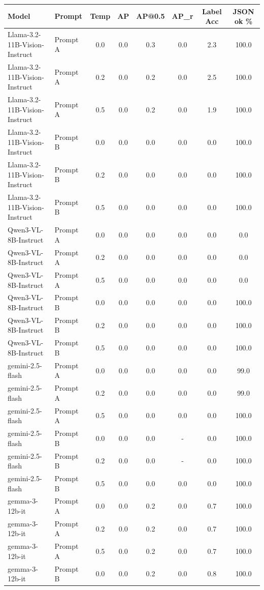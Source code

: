 \begin{tabular}{l l c c c c c c}
\toprule
Model & Prompt & Temp & AP & AP@0.5 & AP\_r & Label Acc & JSON ok \% \\
\midrule
Llama-3.2-11B-Vision-Instruct & Prompt A & 0.0 & 0.0 & 0.3 & 0.0 & 2.3 & 100.0 \\
Llama-3.2-11B-Vision-Instruct & Prompt A & 0.2 & 0.0 & 0.2 & 0.0 & 2.5 & 100.0 \\
Llama-3.2-11B-Vision-Instruct & Prompt A & 0.5 & 0.0 & 0.2 & 0.0 & 1.9 & 100.0 \\
Llama-3.2-11B-Vision-Instruct & Prompt B & 0.0 & 0.0 & 0.0 & 0.0 & 0.0 & 100.0 \\
Llama-3.2-11B-Vision-Instruct & Prompt B & 0.2 & 0.0 & 0.0 & 0.0 & 0.0 & 100.0 \\
Llama-3.2-11B-Vision-Instruct & Prompt B & 0.5 & 0.0 & 0.0 & 0.0 & 0.0 & 100.0 \\
Qwen3-VL-8B-Instruct & Prompt A & 0.0 & 0.0 & 0.0 & 0.0 & 0.0 & 0.0 \\
Qwen3-VL-8B-Instruct & Prompt A & 0.2 & 0.0 & 0.0 & 0.0 & 0.0 & 0.0 \\
Qwen3-VL-8B-Instruct & Prompt A & 0.5 & 0.0 & 0.0 & 0.0 & 0.0 & 0.0 \\
Qwen3-VL-8B-Instruct & Prompt B & 0.0 & 0.0 & 0.0 & 0.0 & 0.0 & 100.0 \\
Qwen3-VL-8B-Instruct & Prompt B & 0.2 & 0.0 & 0.0 & 0.0 & 0.0 & 100.0 \\
Qwen3-VL-8B-Instruct & Prompt B & 0.5 & 0.0 & 0.0 & 0.0 & 0.0 & 100.0 \\
gemini-2.5-flash & Prompt A & 0.0 & 0.0 & 0.0 & 0.0 & 0.0 & 99.0 \\
gemini-2.5-flash & Prompt A & 0.2 & 0.0 & 0.0 & 0.0 & 0.0 & 99.0 \\
gemini-2.5-flash & Prompt A & 0.5 & 0.0 & 0.0 & 0.0 & 0.0 & 100.0 \\
gemini-2.5-flash & Prompt B & 0.0 & 0.0 & 0.0 & - & 0.0 & 100.0 \\
gemini-2.5-flash & Prompt B & 0.2 & 0.0 & 0.0 & - & 0.0 & 100.0 \\
gemini-2.5-flash & Prompt B & 0.5 & 0.0 & 0.0 & 0.0 & 0.0 & 100.0 \\
gemma-3-12b-it & Prompt A & 0.0 & 0.0 & 0.2 & 0.0 & 0.7 & 100.0 \\
gemma-3-12b-it & Prompt A & 0.2 & 0.0 & 0.2 & 0.0 & 0.7 & 100.0 \\
gemma-3-12b-it & Prompt A & 0.5 & 0.0 & 0.2 & 0.0 & 0.7 & 100.0 \\
gemma-3-12b-it & Prompt B & 0.0 & 0.0 & 0.2 & 0.0 & 0.8 & 100.0 \\

\end{tabular}
